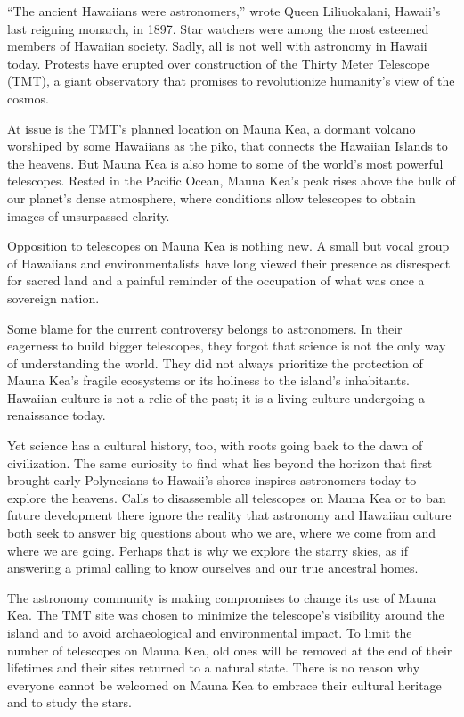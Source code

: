 ``The ancient Hawaiians were astronomers,'' wrote Queen Liliuokalani, Hawaii's last reigning monarch, in 1897. Star watchers were among the most esteemed members of Hawaiian society. Sadly, all is not well with astronomy in Hawaii today. Protests have erupted over construction of the Thirty Meter Telescope (TMT), a giant observatory that promises to revolutionize humanity's view of the cosmos.


At issue is the TMT's planned location on Mauna Kea, a dormant volcano worshiped by some Hawaiians as the piko, that connects the Hawaiian Islands to the heavens. But Mauna Kea is also home to some of the world's most powerful telescopes. Rested in the Pacific Ocean, Mauna Kea's peak rises above the bulk of our planet's dense atmosphere, where conditions allow telescopes to obtain images of unsurpassed clarity.


Opposition to telescopes on Mauna Kea is nothing new. A small but vocal group of Hawaiians and environmentalists have long viewed their presence as disrespect for sacred land and a painful reminder of the occupation of what was once a sovereign nation.


Some blame for the current controversy belongs to astronomers. In their eagerness to build bigger telescopes, they forgot that science is not the only way of understanding the world. They did not always prioritize the protection of Mauna Kea's fragile ecosystems or its holiness to the island's inhabitants. Hawaiian culture is not a relic of the past; it is a living culture undergoing a renaissance today.


Yet science has a cultural history, too, with roots going back to the dawn of civilization. The same curiosity to find what lies beyond the horizon that first brought early Polynesians to Hawaii's shores inspires astronomers today to explore the heavens. Calls to disassemble all telescopes on Mauna Kea or to ban future development there ignore the reality that astronomy and Hawaiian culture both seek to answer big questions about who we are, where we come from and where we are going. Perhaps that is why we explore the starry skies, as if answering a primal calling to know ourselves and our true ancestral homes.


The astronomy community is making compromises to change its use of Mauna Kea. The TMT site was chosen to minimize the telescope's visibility around the island and to avoid archaeological and environmental impact. To limit the number of telescopes on Mauna Kea, old ones will be removed at the end of their lifetimes and their sites returned to a natural state. There is no reason why everyone cannot be welcomed on Mauna Kea to embrace their cultural heritage and to study the stars.